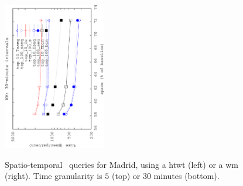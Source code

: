 \begin{figure}[ht]
\begin{center}
			{\includegraphics[angle=-90,width=0.4\textwidth]{figures_synt/madrid_st_topk_wm_30.eps}}
		\end{center}
		\caption{Spatio-temporal \topK\ queries for Madrid, using a \acrshort{htwt} (left) or a \acrshort{wm} (right). 
			Time granularity is $5$ (top) or $30$ minutes (bottom). 
		}
		\label{fig:ctr:exp:queries:st:madrid.tk}
	\end{figure}

